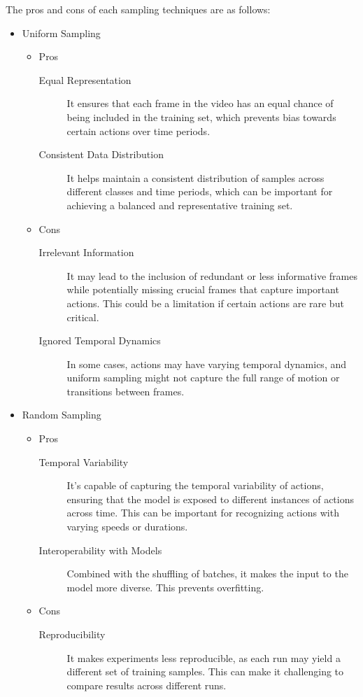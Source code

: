 \documentclass[letterpaper]{article} %
\begin{document}
The pros and cons of each sampling techniques are as follows:
\begin{itemize}
  \item Uniform Sampling
    \begin{itemize}
      \item Pros 
        \begin{description}
          \item[Equal Representation]
            It ensures that each frame in the video 
            has an equal chance of being included in the training set,
            which prevents bias towards certain actions over time periods.
          \item[Consistent Data Distribution]
            It helps maintain a consistent distribution of samples across 
            different classes and time periods, 
            which can be important for achieving a 
            balanced and representative training set.
        \end{description}
      \item Cons
        \begin{description}
          \item[Irrelevant Information]
            It may lead to the inclusion of redundant or less informative frames 
            while potentially missing crucial frames that capture important actions. 
            This could be a limitation if certain actions are rare but critical.
          \item[Ignored Temporal Dynamics]
            In some cases, actions may have varying temporal dynamics, 
            and uniform sampling might not capture the full range of motion 
            or transitions between frames.
        \end{description}
    \end{itemize}

  \item Random Sampling
    \begin{itemize}
      \item Pros
      \begin{description}
        \item[Temporal Variability]
          It's capable of capturing the temporal variability of actions, 
          ensuring that the model is exposed to different instances of actions across time. 
          This can be important for recognizing actions with varying speeds or durations.
        \item[Interoperability with Models]
          Combined with the shuffling of batches,
          it makes the input to the model more diverse.
          This prevents overfitting.
      \end{description}
      \item Cons
      \begin{description}
        \item[Reproducibility]
          It makes experiments less reproducible, as each run may yield a different set of training samples. 
          This can make it challenging to compare results across different runs.
      \end{description}
    \end{itemize}
\end{itemize}
\end{document}
